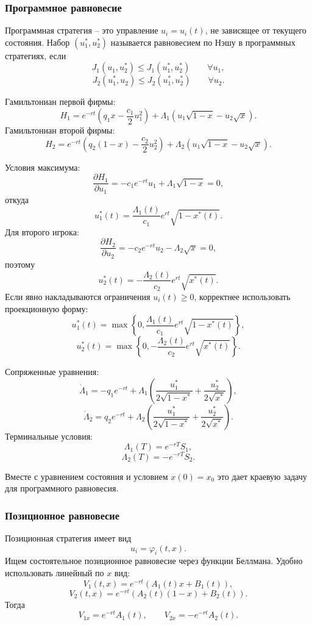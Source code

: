 \documentclass[12pt,a4paper]{article}
\begin{document}
\subsubsection{Программное равновесие}

Программная стратегия -- это управление $u_i=u_i(t)$, не зависящее от текущего состояния. Набор $(u_1^*,u_2^*)$ называется равновесием по Нэшу в программных стратегиях, если
\[
 J_1(u_1,u_2^*)\le J_1(u_1^*,u_2^*)\qquad \forall u_1,
\]
\[
 J_2(u_1^*,u_2)\le J_2(u_1^*,u_2^*)\qquad \forall u_2.
\]

Гамильтониан первой фирмы:
\[
 H_1=e^{-rt}\left(q_1x-\frac{c_1}{2}u_1^2\right)+\Lambda_1\left(u_1\sqrt{1-x}-u_2\sqrt{x}\right).
\]
Гамильтониан второй фирмы:
\[
 H_2=e^{-rt}\left(q_2(1-x)-\frac{c_2}{2}u_2^2\right)+\Lambda_2\left(u_1\sqrt{1-x}-u_2\sqrt{x}\right).
\]

Условия максимума:
\[
 \frac{\partial H_1}{\partial u_1}=-c_1e^{-rt}u_1+\Lambda_1\sqrt{1-x}=0,
\]
откуда
\[
 u_1^*(t)=\frac{\Lambda_1(t)}{c_1}e^{rt}\sqrt{1-x^*(t)}.
\]
Для второго игрока:
\[
 \frac{\partial H_2}{\partial u_2}=-c_2e^{-rt}u_2-\Lambda_2\sqrt{x}=0,
\]
поэтому
\[
 u_2^*(t)=-\frac{\Lambda_2(t)}{c_2}e^{rt}\sqrt{x^*(t)}.
\]
Если явно накладываются ограничения $u_i(t)\ge0$, корректнее использовать проекционную форму:
\[
 u_1^*(t)=\max\left\{0,\frac{\Lambda_1(t)}{c_1}e^{rt}\sqrt{1-x^*(t)}\right\},
\]
\[
 u_2^*(t)=\max\left\{0,-\frac{\Lambda_2(t)}{c_2}e^{rt}\sqrt{x^*(t)}\right\}.
\]

Сопряженные уравнения:
\[
 \dot\Lambda_1=-q_1e^{-rt}+\Lambda_1\left(\frac{u_1^*}{2\sqrt{1-x^*}}+\frac{u_2^*}{2\sqrt{x^*}}\right),
\]
\[
 \dot\Lambda_2=q_2e^{-rt}+\Lambda_2\left(\frac{u_1^*}{2\sqrt{1-x^*}}+\frac{u_2^*}{2\sqrt{x^*}}\right).
\]
Терминальные условия:
\[
 \Lambda_1(T)=e^{-rT}S_1,
\]
\[
 \Lambda_2(T)=-e^{-rT}S_2.
\]

Вместе с уравнением состояния и условием $x(0)=x_0$ это дает краевую задачу для программного равновесия.

\subsubsection{Позиционное равновесие}

Позиционная стратегия имеет вид
\[
 u_i=\varphi_i(t,x).
\]
Ищем состоятельное позиционное равновесие через функции Беллмана. Удобно использовать линейный по $x$ вид:
\[
 V_1(t,x)=e^{-rt}(A_1(t)x+B_1(t)),
\]
\[
 V_2(t,x)=e^{-rt}(A_2(t)(1-x)+B_2(t)).
\]
Тогда
\[
 V_{1x}=e^{-rt}A_1(t),\qquad V_{2x}=-e^{-rt}A_2(t).
\]
\end{document}
